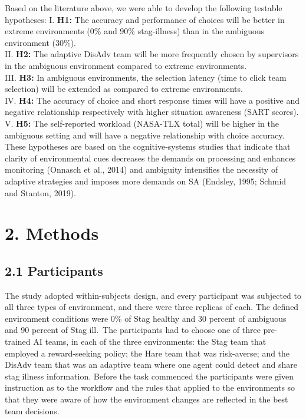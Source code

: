 \documentclass[
]{article}
\begin{document}
Based on the literature above, we were able to develop the following
testable hypotheses: I. \textbf{H1:} The accuracy and performance of
choices will be better in extreme environments (0\% and 90\%
stag-illness) than in the ambiguous environment (30\%).\\
II. \textbf{H2:} The adaptive DisAdv team will be more frequently chosen
by supervisors in the ambiguous environment compared to extreme
environments.\\
III. \textbf{H3:} In ambiguous environments, the selection latency (time
to click team selection) will be extended as compared to extreme
environments.\\
IV. \textbf{H4:} The accuracy of choice and short response times will
have a positive and negative relationship respectively with higher
situation awareness (SART scores).\\
V. \textbf{H5:} The self-reported workload (NASA-TLX total) will be
higher in the ambiguous setting and will have a negative relationship
with choice accuracy.\\
These hypotheses are based on the cognitive-systems studies that
indicate that clarity of environmental cues decreases the demands on
processing and enhances monitoring (Onnasch et al., 2014) and ambiguity
intensifies the necessity of adaptive strategies and imposes more
demands on SA (Endsley, 1995; Schmid and Stanton, 2019).

\section{2. Methods}\label{methods}

\subsection{2.1 Participants}\label{participants}

The study adopted within-subjects design, and every participant was
subjected to all three types of environment, and there were three
replicas of each. The defined environment conditions were 0\% of Stag
healthy and 30 percent of ambiguous and 90 percent of Stag ill.~The
participants had to choose one of three pre-trained AI teams, in each of
the three environments: the Stag team that employed a reward-seeking
policy; the Hare team that was risk-averse; and the DisAdv team that was
an adaptive team where one agent could detect and share stag illness
information. Before the task commenced the participants were given
instruction as to the workflow and the rules that applied to the
environments so that they were aware of how the environment changes are
reflected in the best team decisions.
\end{document}
